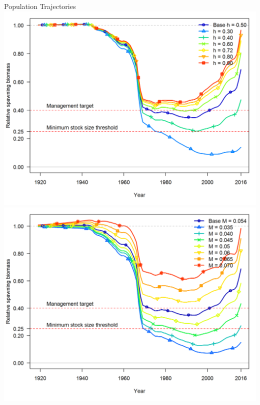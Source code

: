 \documentclass[pdf]{beamer}\usepackage[]{graphicx}\usepackage[]{color}
\begin{document}
\begin{frame}{Population Trajectories}
  \includegraphics[scale = 0.37]{figures/h_trajectories.png}
  \includegraphics[scale = 0.37]{figures/m_trajectories.png}
\end{frame}
\end{document}
